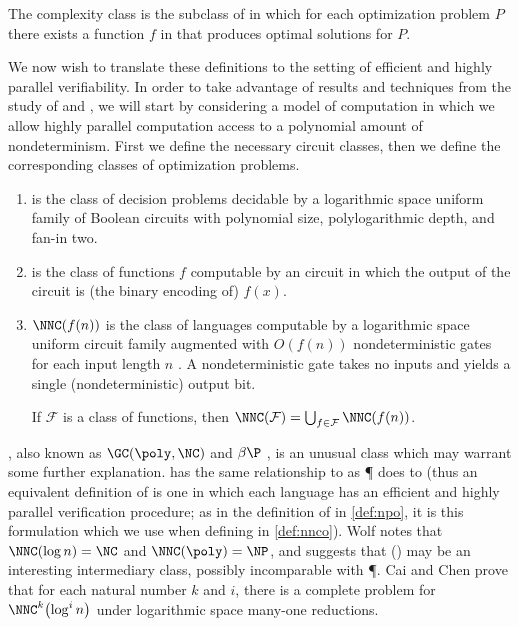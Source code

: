 \documentclass[]{article}
\let\originalleft\left
\let\originalright\right
\renewcommand{\left}{\mathopen{}\mathclose\bgroup\originalleft}
\renewcommand{\right}{\aftergroup\egroup\originalright}
\begin{document}
\begin{definition}
  The complexity class \PO{} is the subclass of \NPO{} in which for each optimization problem $P$ there exists a function $f$ in \FP{} that produces optimal solutions for $P$.
\end{definition}

We now wish to translate these definitions to the setting of efficient and highly parallel verifiability.
In order to take advantage of results and techniques from the study of \NPO{} and \PO, we will start by considering a model of computation in which we allow highly parallel computation access to a polynomial amount of nondeterminism.
First we define the necessary circuit classes, then we define the corresponding classes of optimization problems.

\begin{definition}
  \mbox{}
  \begin{enumerate}
  \item \NC{} is the class of decision problems decidable by a logarithmic space uniform family of Boolean circuits with polynomial size, polylogarithmic depth, and fan-in two.
  \item \FNC{} is the class of functions $f$ computable by an \NC{} circuit in which the output of the circuit is (the binary encoding of) $f(x)$.
  \item $\NNC(f(n))$ is the class of languages computable by a logarithmic space uniform \NC{} circuit family augmented with $O(f(n))$ nondeterministic gates for each input length $n$ \cite{wolf94}.
    A nondeterministic gate takes no inputs and yields a single (nondeterministic) output bit.

    If $\mathcal{F}$ is a class of functions, then $\NNC(\mathcal{F})=\bigcup_{f\in\mathcal{F}}{\NNC(f(n))}$.
  \end{enumerate}
\end{definition}

\NNCpoly, also known as $\GC(\poly, \NC)$ \cite{cc97} and $\beta\P$ \cite{kf80}, is an unusual class which may warrant some further explanation.
\NC{} has the same relationship to \NNCpoly{} as \P{} does to \NP{} (thus an equivalent definition of \NNCpoly{} is one in which each language has an efficient and highly parallel verification procedure; as in the definition of \NPO{} in \autoref{def:npo}, it is this formulation which we use when defining \NNCO{} in \autoref{def:nnco}).
Wolf \cite{wolf94} notes that $\NNC(\log n)=\NC$ and $\NNC(\poly)=\NP$, and suggests that \NNC(\polylog) may be an interesting intermediary class, possibly incomparable with \P.
Cai and Chen \cite{cc97} prove that for each natural number $k$ and $i$, there is a complete problem for $\NNC^k\left(\log^i n\right)$ under logarithmic space many-one reductions.
\end{document}
